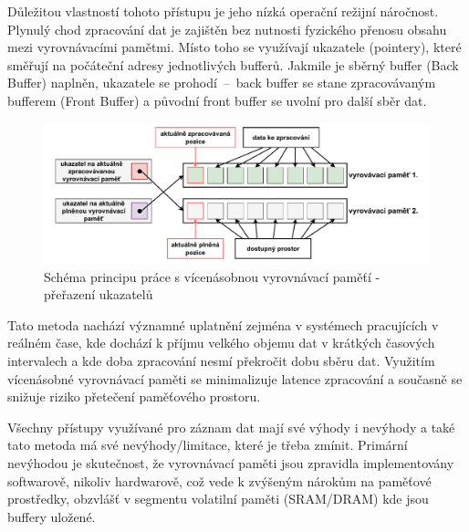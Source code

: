 Důležitou vlastností tohoto přístupu je jeho nízká operační režijní náročnost. Plynulý chod zpracování dat je zajištěn bez nutnosti fyzického přenosu obsahu mezi vyrovnávacími pamětmi. Místo toho se využívají ukazatele (pointery), které směřují na počáteční adresy jednotlivých bufferů. Jakmile je sběrný buffer (Back Buffer) naplněn, ukazatele se prohodí~–~back buffer se stane zpracovávaným bufferem (Front Buffer) a původní front buffer se uvolní pro další sběr dat.

\begin{figure}[h]
    \centering
    \includegraphics[width=1.00\textwidth]{obrazky-figures/multiple_buffering-2.pdf}
    
    \caption{Schéma principu práce s vícenásobnou vyrovnávací paměťí - přeřazení ukazatelů}
    \label{fig:multiple-buffering-2}
\end{figure}

Tato metoda nachází významné uplatnění zejména v systémech pracujících v reálném čase, kde dochází k příjmu velkého objemu dat v krátkých časových intervalech a kde doba zpracování nesmí překročit dobu sběru dat. Využitím vícenásobné vyrovnávací paměti se minimalizuje latence zpracování a současně se snižuje riziko přetečení paměťového prostoru. \cite{buffering_chang}

\newpage

Všechny přístupy využívané pro záznam dat mají své výhody i nevýhody a také tato metoda má své nevýhody/limitace, které je třeba zmínit. Primární nevýhodou je skutečnost, že vyrovnávací paměti jsou zpravidla implementovány softwarově, nikoliv hardwarově, což vede k zvýšeným nárokům na paměťové prostředky, obzvlášť v segmentu volatilní paměti (SRAM/DRAM) kde jsou buffery uložené. \cite{basics_of_digital_forensics}

